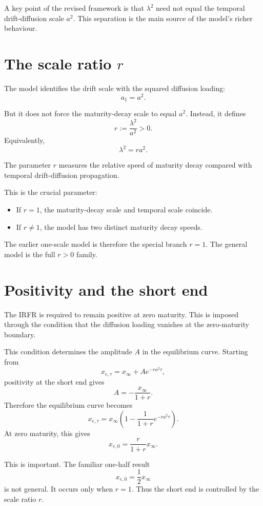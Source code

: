 \documentclass[11pt]{article}
\theoremstyle{plainbreak}
\begin{document}
A key point of the revised framework is that \(\lambda^2\) need not equal the temporal drift-diffusion scale \(a^2\). This separation is the main source of the model's richer behaviour.

\section{The scale ratio \texorpdfstring{\(r\)}{r}}

The model identifies the drift scale with the squared diffusion loading:
\[
a_1=a^2.
\]

But it does not force the maturity-decay scale to equal \(a^2\). Instead, it defines
\[
r:=\frac{\lambda^2}{a^2}>0.
\]
Equivalently,
\[
\lambda^2=ra^2.
\]

The parameter \(r\) measures the relative speed of maturity decay compared with temporal drift-diffusion propagation.

This is the crucial parameter:
\begin{itemize}
    \item If \(r=1\), the maturity-decay scale and temporal scale coincide.
    \item If \(r\neq 1\), the model has two distinct maturity decay speeds.
\end{itemize}

The earlier one-scale model is therefore the special branch \(r=1\). The general model is the full \(r>0\) family.

\section{Positivity and the short end}

The IRFR is required to remain positive at zero maturity. This is imposed through the condition that the diffusion loading vanishes at the zero-maturity boundary.

This condition determines the amplitude \(A\) in the equilibrium curve. Starting from
\[
x_{e,\tau}=x_\infty+A e^{-ra^2\tau},
\]
positivity at the short end gives
\[
A=-\frac{x_\infty}{1+r}.
\]
Therefore the equilibrium curve becomes
\[
x_{e,\tau}
=
x_\infty\left(1-\frac{1}{1+r}e^{-ra^2\tau}\right).
\]
At zero maturity, this gives
\[
x_{e,0}=\frac{r}{1+r}x_\infty.
\]

This is important. The familiar one-half result
\[
x_{e,0}=\frac{1}{2}x_\infty
\]
is not general. It occurs only when \(r=1\). Thus the short end is controlled by the scale ratio \(r\).
\end{document}
